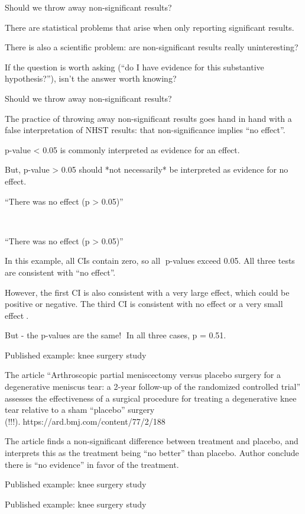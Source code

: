 \documentclass[
  letterpaper,
  DIV=11,
  numbers=noendperiod]{scrreprt}
\begin{document}
Should we throw away non-significant results?

There are statistical problems that arise when only reporting
significant results.

There is also a scientific problem: are non-significant results really
uninteresting?

If the question is worth asking (``do I have evidence for this
substantive hypothesis?''), isn't the answer worth knowing?

Should we throw away non-significant results?

The practice of throwing away non-significant results goes hand in hand
with a false interpretation of NHST results: that non-significance
implies ``no effect''.

p-value \textless{} 0.05 is commonly interpreted as evidence for an
effect.

But, p-value \textgreater{} 0.05 should *not necessarily* be interpreted
as evidence for no effect.

``There was no effect (p \textgreater{} 0.05)''

~

``There was no effect (p \textgreater{} 0.05)''

In this example, all CIs contain zero, so all p-values exceed 0.05. All
three tests are consistent with ``no effect''.

However, the first CI is also consistent with a very large effect, which
could be positive or negative. The third CI is consistent with no effect
or a very small effect.

But - the p-values are the same! In all three cases, p = 0.51.

Published example: knee surgery study

The article ``Arthroscopic partial meniscectomy versus placebo surgery
for a degenerative meniscus tear: a 2-year follow-up of the randomized
controlled trial'' assesses the effectiveness of a surgical procedure
for treating a degenerative knee tear relative to a sham ``placebo''
surgery (!!!).https://ard.bmj.com/content/77/2/188

The article finds a non-significant difference between treatment and
placebo, and interprets this as the treatment being ``no better'' than
placebo. Author conclude there is ``no evidence'' in favor of the
treatment.

Published example: knee surgery study

Published example: knee surgery study
\end{document}
